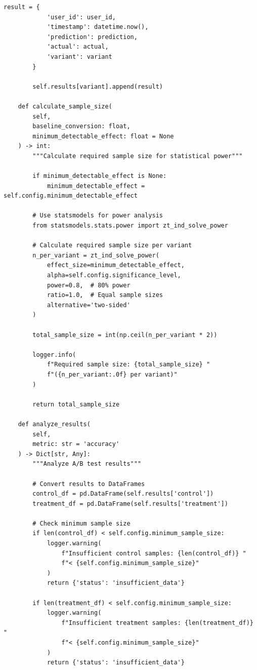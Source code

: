 \begin{lstlisting}[style=python, caption=A/B Testing Framework for ML Models]
        result = {
            'user_id': user_id,
            'timestamp': datetime.now(),
            'prediction': prediction,
            'actual': actual,
            'variant': variant
        }

        self.results[variant].append(result)

    def calculate_sample_size(
        self,
        baseline_conversion: float,
        minimum_detectable_effect: float = None
    ) -> int:
        """Calculate required sample size for statistical power"""

        if minimum_detectable_effect is None:
            minimum_detectable_effect = self.config.minimum_detectable_effect

        # Use statsmodels for power analysis
        from statsmodels.stats.power import zt_ind_solve_power

        # Calculate required sample size per variant
        n_per_variant = zt_ind_solve_power(
            effect_size=minimum_detectable_effect,
            alpha=self.config.significance_level,
            power=0.8,  # 80% power
            ratio=1.0,  # Equal sample sizes
            alternative='two-sided'
        )

        total_sample_size = int(np.ceil(n_per_variant * 2))

        logger.info(
            f"Required sample size: {total_sample_size} "
            f"({n_per_variant:.0f} per variant)"
        )

        return total_sample_size

    def analyze_results(
        self,
        metric: str = 'accuracy'
    ) -> Dict[str, Any]:
        """Analyze A/B test results"""

        # Convert results to DataFrames
        control_df = pd.DataFrame(self.results['control'])
        treatment_df = pd.DataFrame(self.results['treatment'])

        # Check minimum sample size
        if len(control_df) < self.config.minimum_sample_size:
            logger.warning(
                f"Insufficient control samples: {len(control_df)} "
                f"< {self.config.minimum_sample_size}"
            )
            return {'status': 'insufficient_data'}

        if len(treatment_df) < self.config.minimum_sample_size:
            logger.warning(
                f"Insufficient treatment samples: {len(treatment_df)} "
                f"< {self.config.minimum_sample_size}"
            )
            return {'status': 'insufficient_data'}


\end{lstlisting}
